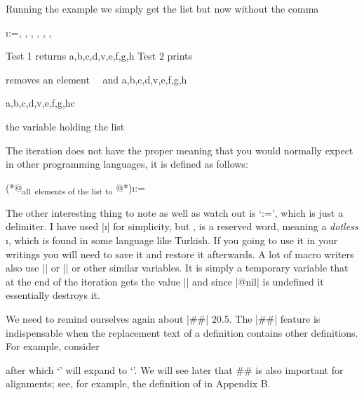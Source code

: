 Running the example we simply get the list but now without the comma

\begin{teX}
\makeatletter
\def\mathList{\alpha, \beta, \gamma, \delta, \epsilon, \zeta, \theta }
\@for\i:=\mathList\do{%
  \ensuremath \i  \space 
 }
\makeatother
\end{teX}




\begin{teX}
\makeatletter
\def\atestiii{}
\def\alist{a,b,c,d,v,e,f,g,h}
Test 1 \@removeelement{v}{a,b,c,d,v,e,f,g,h}{\atestiii} 
returns \atestiii
\alist
\gdef\blist{1,2,3,4,5,v,6,7}%
Test 2 \@removeelement{v}{\expand\blist}{\atestii} prints \atestii
\meaning\atestii
\meaning\@removeelement

\def\remove#1#2{
 \@removeelement #2{#1}\atestiii \atestiii
}

removes an element \atestiii ~~and \alist

\remove c\alist 


the variable holding the list \atestiii
\end{teX}


The iteration does not have the proper meaning that you would normally expect in other programming languages, it is defined as follows:


\begin{teXXX}
\@for(*@\textsubscript{all~elements of the list to }@*)\i:=\mathList\do{%
  \ensuremath \i  \space 
 }
\end{teXXX}

The other interesting thing to note as well as watch out is `:=', which is just a delimiter. I have used |\i| for simplicity, but \cmd{\i}, is a reserved word, meaning a \textit{dotless} \i, which is found in some language like Turkish. If you going to use it in your writings you will need to save it and restore it afterwards. A lot of macro writers also use |\ii| or |\@i| or other similar variables. It is simply a temporary variable that at the end of the iteration gets the value |\@nil| and since |@nil| is undefined it essentially destroys it. 

We need to remind ourselves again about |##|
20.5. The |##| feature is indispensable when the replacement text of a definition
contains other definitions. For example, consider


\begin{teX}
\def\a#1{\def\b##1{##1#1}}
after which `\a!' will expand to `\def\b#1{#1!}'. We will see later that ## is also
important for alignments; see, for example, the definition of \matrix in Appendix B.
\end{teX}

